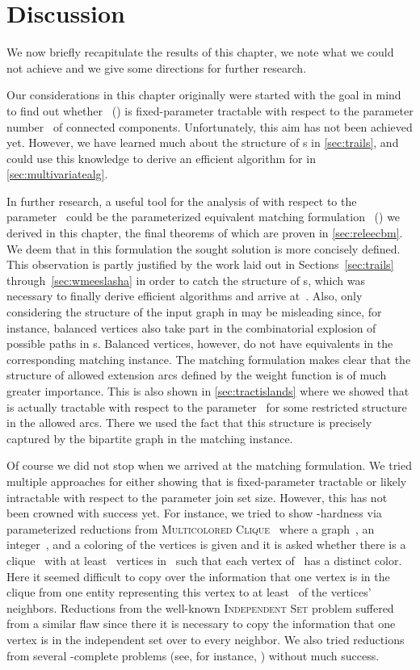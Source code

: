 \section{Discussion}
We now briefly recapitulate the results of this chapter, we note what we could not achieve and we give some directions for further research.

Our considerations in this chapter originally were started with the goal in mind to find out whether \pWMEE{}~(\pWMEEs{}) is fixed-parameter tractable with respect to the parameter number~ of connected components.
Unfortunately, this aim has not been achieved yet. However, we have learned much about the structure of \EE s in \autoref{sec:trails}, and could use this knowledge to derive an efficient algorithm for \pWMEEs{} in \autoref{sec:multivariatealg}. 

In further research, a useful tool for the analysis of \pWMEEs{} with respect to the parameter~ could be the parameterized equivalent matching formulation \pCBM{}~(\pCBMs{}) we derived in this chapter, the final theorems of which are proven in \autoref{sec:releecbm}. We deem that in this formulation the sought solution is more concisely defined. This observation is partly justified by the work laid out in Sections~\ref{sec:trails} through~\ref{sec:wmeeslasha} in order to catch the structure of \EE s, which was necessary to finally derive efficient algorithms and arrive at~\pCBMs{}. Also, only considering the structure of the input graph in \pWMEEs{} may be misleading since, for instance, balanced vertices also take part in the combinatorial explosion of possible paths in \EE s. Balanced vertices, however, do not have equivalents in the corresponding matching instance. The matching formulation makes clear that the structure of allowed extension arcs defined by the weight function is of much greater importance. This is also shown in \autoref{sec:tractislands} where we showed that \pWMEEs{} is actually tractable with respect to the parameter~ for some restricted structure in the allowed arcs. There we used the fact that this structure is precisely captured by the bipartite graph in the matching instance.

Of course we did not stop when we arrived at the matching formulation. We tried multiple approaches for either showing that \pCBMs{} is fixed-parameter tractable or likely intractable with respect to the parameter join set size. However, this has not been crowned with success yet. For instance, we tried to show -hardness via parameterized reductions from \textsc{Multicolored Clique}~\cite{FHRV09} where a graph~, an integer~, and a coloring of the vertices is given and it is asked whether there is a clique~ with at least~ vertices in~ such that each vertex of~ has a distinct color. Here it seemed difficult to copy over the information that one vertex is in the clique from one entity representing this vertex to at least~ of the vertices' neighbors. Reductions from the well-known \textsc{Independent Set} problem suffered from a similar flaw since there it is necessary to copy the information that one vertex is in the independent set over to every neighbor. We also tried reductions from several -complete problems (see, for instance, \citet{FG06}) without much success. 

